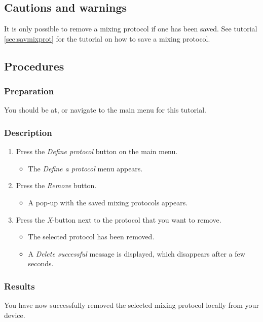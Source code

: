 \subsection{Cautions and warnings}
It is only possible to remove a mixing protocol if one has been saved. See tutorial \ref{sec:savmixprot} for the tutorial on how to save a mixing protocol.

\subsection{Procedures}

\subsubsection{Preparation}
You should be at, or navigate to the main menu for this tutorial.

\subsubsection{Description}
\begin{enumerate}
	\item Press the \emph{Define protocol} button on the main menu.
		\begin{itemize}
            \item The \emph{Define a protocol} menu appears.
		\end{itemize}
	\item Press the \emph{Remove} button.
		\begin{itemize}
			\item A pop-up with the saved mixing protocols appears.
		\end{itemize}
	\item Press the \emph{X}-button next to the protocol that you want to remove.
		\begin{itemize}
			\item The selected protocol has been removed.
			\item A \emph{Delete successful} message is displayed, which disappears after a few seconds.
		\end{itemize}
\end{enumerate}

\subsubsection{Results}
You have now successfully removed the selected mixing protocol locally from your device.

